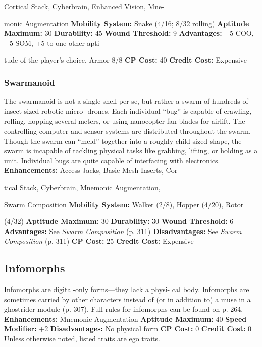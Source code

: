 Cortical Stack, Cyberbrain, Enhanced Vision, Mne-

monic Augmentation
\textbf{Mobility System:} Snake (4/16; 8/32 rolling)
\textbf{Aptitude Maximum: }30
\textbf{Durability: }45
\textbf{Wound Threshold: }9
\textbf{Advantages: }+5 COO, +5 SOM, +5 to one other apti-

tude of the player's choice, Armor 8/8
\textbf{CP Cost:} 40
\textbf{Credit Cost: }Expensive

\subsubsection{Swarmanoid}

The swarmanoid is not a single shell per se, but rather 
a swarm of hundreds of insect-sized robotic micro-
drones. Each individual ``bug'' is capable of crawling, 
rolling, hopping several meters, or using nanocopter 
fan blades for airlift. The controlling computer and 
sensor systems are distributed throughout the swarm. 
Though the swarm can ``meld'' together into a roughly 
child-sized shape, the swarm is incapable of tackling 
physical tasks like grabbing, lifting, or holding as a 
unit. Individual bugs are quite capable of interfacing 
with electronics.
\textbf{Enhancements:} Access Jacks, Basic Mesh Inserts, Cor-

tical Stack, Cyberbrain, Mnemonic Augmentation, 

Swarm Composition
\textbf{Mobility System:} Walker (2/8), Hopper (4/20), Rotor 

(4/32)
\textbf{Aptitude Maximum: }30
\textbf{Durability:} 30
\textbf{Wound Threshold: }6
\textbf{Advantages: }See \textit{Swarm Composition} (p. 311)
\textbf{Disadvantages: }See \textit{Swarm Composition} (p. 311)
\textbf{CP Cost: }25
\textbf{Credit Cost: }Expensive

\subsection{Infomorphs}

Infomorphs are digital-only forms—they lack a physi-
cal body. Infomorphs are sometimes carried by other 
characters instead of (or in addition to) a muse in a 
ghostrider module (p. 307). Full rules for infomorphs 
can be found on p. 264.
\textbf{Enhancements: }Mnemonic Augmentation
\textbf{Aptitude Maximum: }40
\textbf{Speed Modifier:} +2
\textbf{Disadvantages: }No physical form
\textbf{CP Cost: }0
\textbf{Credit Cost: }0
Unless otherwise noted, listed traits are ego traits.


